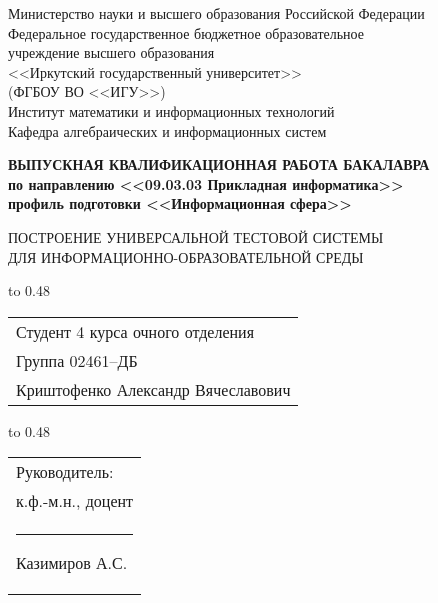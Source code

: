 \thispagestyle{empty}
\begin{center}
Министерство науки и высшего образования Российской Федерации\\
Федеральное государственное бюджетное образовательное\\
учреждение высшего образования\\
<<Иркутский государственный университет>>\\
(ФГБОУ ВО <<ИГУ>>)\\
Институт математики и информационных технологий\\
Кафедра алгебраических и информационных систем\\
\end{center}

\vspace{1.7cm}

\begin{center}
{\bf 
ВЫПУСКНАЯ КВАЛИФИКАЦИОННАЯ РАБОТА
БАКАЛАВРА\\[1mm]
по направлению <<09.03.03 Прикладная информатика>>\\[1mm]
профиль подготовки <<Информационная сфера>>
}  

\vspace{0.9cm}

{
ПОСТРОЕНИЕ УНИВЕРСАЛЬНОЙ 
ТЕСТОВОЙ СИСТЕМЫ\\[1mm]
ДЛЯ ИНФОРМАЦИОННО-ОБРАЗОВАТЕЛЬНОЙ СРЕДЫ 
} %
\end{center}

\vspace{1.3cm}

{
\noindent\hbox to 0.48\textwidth {%
	\mbox{ } \hfil} %
	\begin{tabular}[t]{l}
		Студент 4 курса очного отделения\\
		Группа 02461--ДБ\\
		Криштофенко Александр 
		Вячеславович		
	\end{tabular}		
}

\vspace{0.5cm}

{
	\noindent\hbox to 0.48\textwidth {%
		\mbox{ } \hfil} %
	\begin{tabular}[t]{l}
		Руководитель:\\ к.ф.-м.н., доцент\\
		\rule{2.7cm}{0.5pt} Казимиров А.С.		
	\end{tabular}		
}

\vspace{0.5cm}

